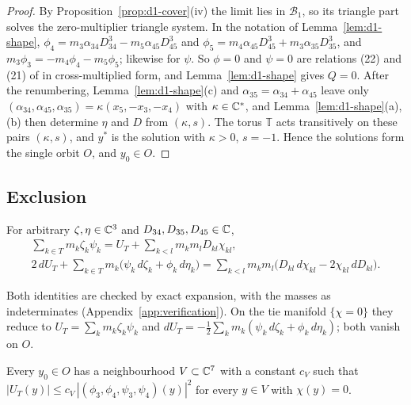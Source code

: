 \begin{proof}
By Proposition~\ref{prop:d1-cover}(iv) the limit lies in $\mathcal B_1$, so its triangle part
solves the zero-multiplier triangle system.  In the notation of Lemma~\ref{lem:d1-shape},
$\phi_4=m_3\alpha_{34}D_{34}^3-m_5\alpha_{45}D_{45}^3$ and
$\phi_5=m_4\alpha_{45}D_{45}^3+m_3\alpha_{35}D_{35}^3$, and $m_3\phi_3=-m_4\phi_4-m_5\phi_5$;
likewise for $\psi$.  So $\phi=0$ and $\psi=0$ are relations (22) and (21) of \cite[\S8.1]{AK} in
cross-multiplied form, and Lemma~\ref{lem:d1-shape} gives $Q=0$.
After the renumbering, Lemma~\ref{lem:d1-shape}(c) and $\alpha_{35}=\alpha_{34}+\alpha_{45}$
leave only $(\alpha_{34},\alpha_{45},\alpha_{35})=\kappa(x_5,-x_3,-x_4)$ with $\kappa\in\mathbb{C}^*$, and
Lemma~\ref{lem:d1-shape}(a),(b) then determine $\eta$ and $D$ from $(\kappa,s)$.  The torus
$\mathbb T$ acts transitively on these pairs $(\kappa,s)$, and $y^*$ is the solution with
$\kappa>0$, $s=-1$.  Hence the solutions form the single orbit $O$, and $y_0\in O$.
\end{proof}

\subsection{Exclusion}

\begin{lemma}\label{lem:d1-virial}
For arbitrary $\zeta,\eta\in\mathbb{C}^3$ and $D_{34},D_{35},D_{45}\in\mathbb{C}$,
\begin{gather*}
  \sum_{k\in T}m_k\zeta_k\psi_k=U_T+\sum_{k<l}m_km_lD_{kl}\chi_{kl},\\
  2\,dU_T+\sum_{k\in T}m_k\big(\psi_k\,d\zeta_k+\phi_k\,d\eta_k\big)
  =\sum_{k<l}m_km_l\big(D_{kl}\,d\chi_{kl}-2\chi_{kl}\,dD_{kl}\big).
\end{gather*}
\end{lemma}
Both identities are checked by exact expansion, with the masses as indeterminates
(Appendix~\ref{app:verification}).
On the tie manifold $\{\chi=0\}$ they reduce to $U_T=\sum_km_k\zeta_k\psi_k$ and
$dU_T=-\frac12\sum_km_k(\psi_k\,d\zeta_k+\phi_k\,d\eta_k)$; both vanish on $O$.

\begin{lemma}\label{lem:d1-estimate}
Every $y_0\in O$ has a neighbourhood $V\subset\mathbb{C}^7$ with a constant $c_V$ such that
$|U_T(y)|\le c_V\,|(\phi_3,\phi_4,\psi_3,\psi_4)(y)|^2$ for every $y\in V$ with $\chi(y)=0$.
\end{lemma}

